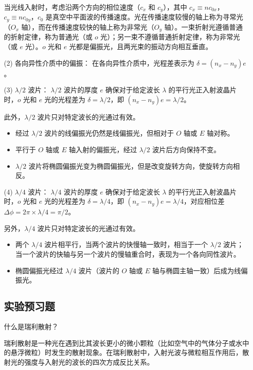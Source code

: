 \documentclass[dvipsnames, svgnames,a4paper,11pt]{article}
\begin{document}
当光线入射时，考虑沿两个方向的相位速度（$c_x$ 和 $c_y$），其中 $c_x \equiv n c_{0x}$，$c_y \equiv n c_{0y}$，$c_0$ 是真空中平面波的传播速度。光在传播速度较慢的轴上称为寻常光（$O_x$ 轴），而在传播速度较快的轴上称为非常光（$O_y$ 轴）。一束折射光遵循普通的折射定律，称为普通光（或 $o$ 光）；另一束不遵循普通折射定律，称为非常光（或 $e$ 光）。$o$ 光和 $e$ 光都是偏振光，且两光束的振动方向相互垂直。

(2) 各向异性介质中的偏振：
在各向异性介质中，光程差表示为 $\delta = (n_x - n_y) e$。

(3) $\lambda/2$ 波片：
$\lambda/2$ 波片的厚度 $e$ 确保对于给定波长 $\lambda$ 的平行光正入射波晶片时，$o$ 光和 $e$ 光的光程差为 $\delta = \lambda/2$，即 $(n_x - n_y) e = \lambda/2$。

此外，$\lambda/2$ 波片只对特定波长的光通过有效。
\begin{itemize}
    \item 经过 $\lambda/2$ 波片的线偏振光仍然是线偏振光，但相对于 $O$ 轴或 $E$ 轴对称。
    \item 平行于 $O$ 轴或 $E$ 轴入射的偏振光，经过 $\lambda/2$ 波片后方向保持不变。
    \item $\lambda/2$ 波片将椭圆偏振光变为椭圆偏振光，但是改变旋转方向，使旋转方向相反。
\end{itemize}

(4) $\lambda/4$ 波片：
$\lambda/4$ 波片的厚度 $e$ 确保对于给定波长 $\lambda$ 的平行光正入射波晶片时，$o$ 光和 $e$ 光的光程差为 $\delta = \lambda/4$，即 $(n_x - n_y) e = \lambda/4$，对应相位差 $\Delta\phi = 2\pi \times \lambda/4 = \pi/2$。

另外，$\lambda/4$ 波片只对特定波长的光通过有效。
\begin{itemize}
    \item 两个 $\lambda/4$ 波片相平行，当两个波片的快慢轴一致时，相当于一个 $\lambda/2$ 波片；当一个波片的快轴与另一个波片的慢轴重合时，表现为一个各向同性波片。
    \item 椭圆偏振光经过 $\lambda/4$ 波片（波片的 $O$ 轴或 $E$ 轴与椭圆主轴一致）后成为线偏振光。
\end{itemize}

	
	
	
	\subsection{实验预习题}
	
	\begin{question}
		什么是瑞利散射？
	\end{question}
	瑞利散射是一种光在遇到比其波长更小的微小颗粒（比如空气中的气体分子或水中的悬浮微粒）时发生的散射现象。在瑞利散射中，入射光波与微粒相互作用后，散射光的强度与入射光的波长的四次方成反比关系。
\end{document}
